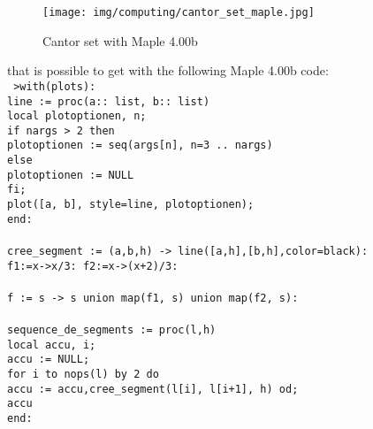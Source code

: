 	\pagebreak
	\begin{tcolorbox}[colframe=black,colback=white,sharp corners]
	\begin{figure}[H]
		\centering
		\texttt{[image: img/computing/cantor\_set\_maple.jpg]}
		\caption{Cantor set with Maple 4.00b}
	\end{figure}
	that is possible to get with the following Maple 4.00b code:\\
	
	\texttt{
	>with(plots):\\
	line := proc(a:: list, b:: list)\\
	local plotoptionen, n;\\
	if nargs > 2 then\\
	plotoptionen := seq(args[n], n=3 .. nargs)\\
	else \\
	plotoptionen := NULL\\
	fi;\\
	plot([a, b], style=line, plotoptionen);\\
	end:\\\\
	cree\_segment := (a,b,h) -> line([a,h],[b,h],color=black): \\
	f1:=x->x/3: f2:=x->(x+2)/3:\\\\
	f := s -> s union map(f1, s) union map(f2, s):\\\\
	sequence\_de\_segments := proc(l,h) \\
	local accu, i;\\
	accu := NULL;\\
	for i to nops(l) by 2 do\\
	accu := accu,cree\_segment(l[i], l[i+1], h) od;\\
	accu\\
	end:
	}
	\end{tcolorbox}
	
